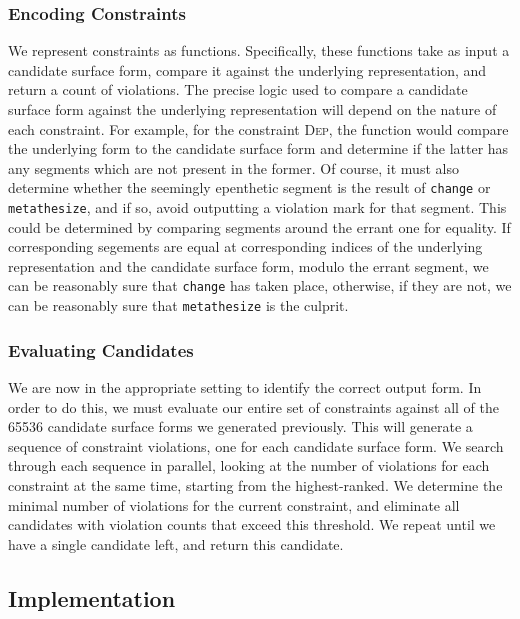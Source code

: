 \documentclass[12pt]{article}
\begin{document}
\subsubsection{Encoding Constraints}

We represent constraints as functions. Specifically, these functions take as
input a candidate surface form, compare it against the underlying
representation, and return a count of violations. The precise logic used to
compare a candidate surface form against the underlying representation will
depend on the nature of each constraint. For example, for the constraint
\textsc{Dep}, the function would compare the underlying form to the candidate
surface form and determine if the latter has any segments which are not present
in the former. Of course, it must also determine whether the seemingly
epenthetic segment is the result of \texttt{change} or \texttt{metathesize},
and if so, avoid outputting a violation mark for that segment. This could be
determined by comparing segments around the errant one for equality. If
corresponding segements are equal at corresponding indices of the underlying
representation and the candidate surface form, modulo the errant segment, we
can be reasonably sure that \texttt{change} has taken place, otherwise, if
they are not, we can be reasonably sure that \texttt{metathesize} is the
culprit.

\subsubsection{Evaluating Candidates}

We are now in the appropriate setting to identify the correct output form. In
order to do this, we must evaluate our entire set of constraints against all of
the 65536 candidate surface forms we generated previously. This will generate a
sequence of constraint violations, one for each candidate surface form. We
search through each sequence in parallel, looking at the number of violations
for each constraint at the same time, starting from the highest-ranked. We
determine the minimal number of violations for the current constraint, and
eliminate all candidates with violation counts that exceed this threshold. We
repeat until we have a single candidate left, and return this candidate.

\subsection{Implementation}
\end{document}
